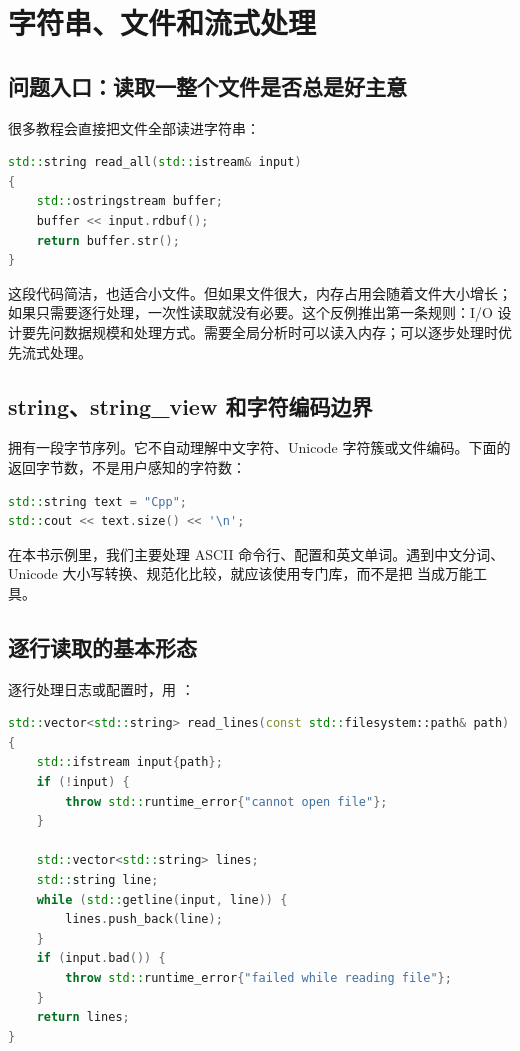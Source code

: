 \chapter{字符串、文件和流式处理}

\section{问题入口：读取一整个文件是否总是好主意}

很多教程会直接把文件全部读进字符串：

\begin{lstlisting}[language=C++,caption={一次性读取文件的思路}]
std::string read_all(std::istream& input)
{
    std::ostringstream buffer;
    buffer << input.rdbuf();
    return buffer.str();
}
\end{lstlisting}

这段代码简洁，也适合小文件。但如果文件很大，内存占用会随着文件大小增长；如果只需要逐行处理，一次性读取就没有必要。这个反例推出第一条规则：I/O 设计要先问数据规模和处理方式。需要全局分析时可以读入内存；可以逐步处理时优先流式处理。

\section{string、string\_view 和字符编码边界}

 拥有一段字节序列。它不自动理解中文字符、Unicode 字符簇或文件编码。下面的  返回字节数，不是用户感知的字符数：

\begin{lstlisting}[language=C++,caption={string 的 size 是字节数量}]
std::string text = "Cpp";
std::cout << text.size() << '\n';
\end{lstlisting}

在本书示例里，我们主要处理 ASCII 命令行、配置和英文单词。遇到中文分词、Unicode 大小写转换、规范化比较，就应该使用专门库，而不是把  当成万能工具。

\section{逐行读取的基本形态}

逐行处理日志或配置时，用 ：

\begin{lstlisting}[language=C++,caption={逐行读取文件}]
std::vector<std::string> read_lines(const std::filesystem::path& path)
{
    std::ifstream input{path};
    if (!input) {
        throw std::runtime_error{"cannot open file"};
    }

    std::vector<std::string> lines;
    std::string line;
    while (std::getline(input, line)) {
        lines.push_back(line);
    }
    if (input.bad()) {
        throw std::runtime_error{"failed while reading file"};
    }
    return lines;
}
\end{lstlisting}

